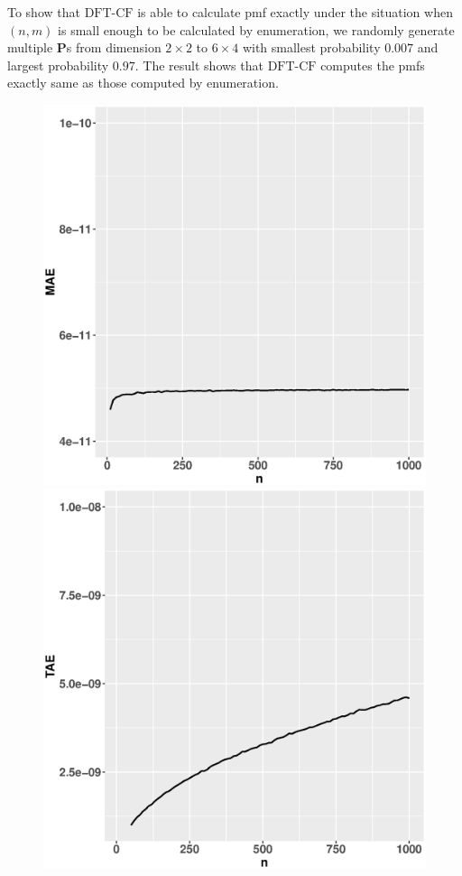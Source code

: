 \documentclass[12pt]{article}
\newcommand{\Pmat}{\mathbf{P}}
\newcommand{\dft}{{\textrm{DFT-CF}}}
\begin{document}
To show that $\dft$ is able to calculate pmf exactly under the situation when $(n,m)$ is small enough to be calculated by enumeration, we randomly generate multiple $\Pmat$s from dimension $2 \times 2$ to $6 \times 4$ with smallest probability $0.007$ and largest probability $0.97$. The result shows that $\dft$ computes the pmfs exactly same as those computed by enumeration.
\begin{figure}
    \centering
    \begin{minipage}{0.45\textwidth}
        \centering
        \includegraphics[width=1\textwidth]{figures/poi_mae.eps}
    \end{minipage}\hfill
    \begin{minipage}{0.45\textwidth}
        \centering
        \includegraphics[width=1\textwidth]{figures/poi_tae.eps}

\end{minipage}
\end{figure}
\end{document}
